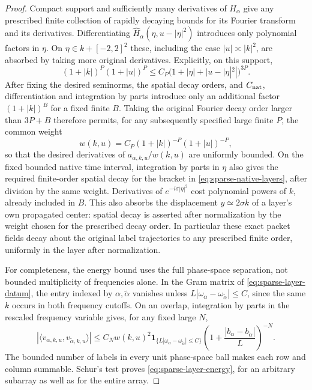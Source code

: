 \begin{proof}
Compact support and sufficiently many derivatives of $H_\alpha$ give
any prescribed finite collection of rapidly decaying bounds for its
Fourier transform and its derivatives.  Differentiating
$\widehat H_\alpha(\eta,u-|\eta|^2)$ introduces only polynomial factors
in $\eta$.  On $\eta\in k+[-2,2]^2$ these, including the case
$|u|\asymp |k|^2$, are absorbed by taking more original derivatives.
Explicitly, on this support,
\[
 (1+|k|)^P(1+|u|)^P
 \le C_P\bigl(1+|\eta|+|u-|\eta|^2|\bigr)^{3P}.
\]
After fixing the desired seminorms, the spatial decay orders, and
$C_{\rm nat}$, differentiation and integration by parts introduce only
an additional factor $(1+|k|)^B$ for a fixed finite $B$.  Taking the
original Fourier decay order larger than $3P+B$ therefore permits,
for any subsequently specified large finite $P$, the common weight
\[
 w(k,u)=C_P(1+|k|)^{-P}(1+|u|)^{-P},
\]
so that the desired derivatives of $a_{\alpha,k,u}/w(k,u)$ are uniformly
bounded.  On the fixed bounded native time interval, integration by
parts in $\eta$ also gives the required finite-order spatial decay for
the bracket in \eqref{eq:sparse-native-layers}, after division by the
same weight.  Derivatives of $e^{-i\sigma|\eta|^2}$ cost polynomial
powers of $k$, already included in $B$.  This also absorbs the
displacement $y\simeq2\sigma k$ of a layer's own propagated center:
spatial decay is asserted after normalization by the weight chosen
for the prescribed decay order.  In particular these
exact packet fields decay about the original label trajectories to any
prescribed finite order, uniformly in the layer after normalization.

For completeness, the energy bound uses the full phase-space separation,
not bounded multiplicity of frequencies alone.  In the Gram matrix of
\eqref{eq:sparse-layer-datum}, the entry indexed by $\alpha,\widetilde\alpha$
vanishes unless
$L|\omega_\alpha-\omega_{\widetilde\alpha}|\le C$, since the same
$k$ occurs in both frequency cutoffs.  On an overlap, integration by
parts in the rescaled frequency variable gives, for any fixed large $N$,
\begin{equation}\label{eq:sparse-gram}
 |\langle v_{\alpha,k,u},v_{\widetilde\alpha,k,u}\rangle|
 \le C_N w(k,u)^2
    \mathbf1_{\{L|\omega_\alpha-\omega_{\widetilde\alpha}|\le C\}}
    \left(1+\frac{|b_\alpha-b_{\widetilde\alpha}|}{L}\right)^{-N}.
\end{equation}
The bounded number of labels in every unit phase-space ball makes each
row and column summable.  Schur's test proves
\eqref{eq:sparse-layer-energy}, for an arbitrary subarray as well as
for the entire array.
\end{proof}

